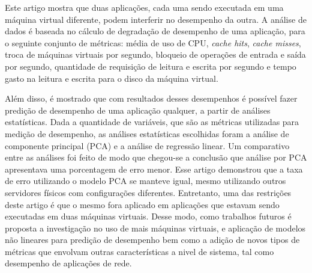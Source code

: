 Este artigo mostra que duas aplicações, cada uma sendo executada em uma máquina virtual diferente, podem interferir no desempenho da outra. A análise de dados é baseada no cálculo de degradação de desempenho de uma aplicação, para o seguinte conjunto de métricas: média de uso de CPU, \textit{cache hits}, \textit{cache misses}, troca de máquinas virtuais por segundo, bloqueio de operações de entrada e saída por segundo, quantidade de requisição de leitura e escrita por segundo e tempo gasto na leitura e escrita para o disco da máquina virtual. %


Além disso, é mostrado que com resultados desses desempenhos é possível fazer predição de desempenho de uma aplicação qualquer, a partir de análises estatísticas. Dada a quantidade de variáveis, que são as métricas utilizadas para medição de desempenho, as análises estatísticas escolhidas foram a análise de componente principal (PCA) e a análise de regressão linear. Um comparativo entre as análises foi feito de modo que chegou-se a conclusão que análise por PCA apresentava uma porcentagem de erro menor. Esse artigo demonstrou que a taxa de erro utilizando o modelo PCA se manteve igual, mesmo utilizando outros servidores físicos com configurações diferentes. Entretanto, uma das restrições deste artigo é que o mesmo fora aplicado em aplicações que estavam sendo executadas em duas máquinas virtuais. Desse modo, como trabalhos futuros é proposta a investigação no uso de mais máquinas virtuais, e aplicação de modelos não lineares para predição de desempenho bem como a adição de novos tipos de métricas que envolvam outras características a nivel de sistema, tal como desempenho de aplicações de rede.

